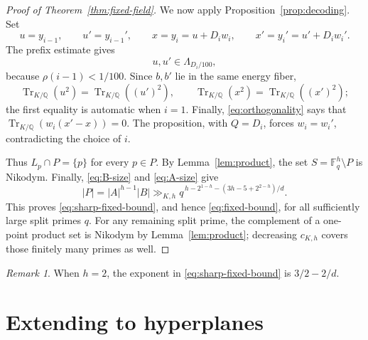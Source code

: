 \documentclass[11pt]{article}
\theoremstyle{plain}
\theoremstyle{remark}
\newtheorem{remark}[theorem]{Remark}
\newcommand{\F}{\mathbb F}
\newcommand{\Q}{\mathbb Q}
\newcommand{\Tr}{\operatorname{Tr}_{K/\Q}}
\begin{document}
\begin{proof}[Proof of Theorem~\ref{thm:fixed-field}]
We now apply Proposition~\ref{prop:decoding}.  Set
\[
  u=y_{i-1},
  \qquad
  u'=y_{i-1}',
  \qquad
  x=y_i=u+D_iw_i,
  \qquad
  x'=y_i'=u'+D_iw_i'.
\]
The prefix estimate gives
\[
  u,u'\in\Lambda_{D_i/100},
\]
because $\rho(i-1)<1/100$.  Since $b,b'$ lie in the same energy fiber,
\[
  \Tr(u^2)=\Tr((u')^2),
  \qquad
  \Tr(x^2)=\Tr((x')^2);
\]
the first equality is automatic when $i=1$.  Finally,
\eqref{eq:orthogonality} says that $\Tr(w_i(x'-x))=0$.  The proposition,
with $Q=D_i$, forces $w_i=w_i'$, contradicting the choice of $i$.

Thus $L_p\cap P=\{p\}$ for every $p\in P$.  By
Lemma~\ref{lem:product}, the set $S=\F_q^h\setminus P$ is Nikodym.  Finally,
\eqref{eq:B-size} and \eqref{eq:A-size} give
\[
  |P|=|A|^{h-1}|B|
  \gg_{K,h}q^{\,h-2^{1-h}-(3h-5+2^{2-h})/d}.
\]
This proves \eqref{eq:sharp-fixed-bound}, and hence
\eqref{eq:fixed-bound}, for all sufficiently large split primes $q$.
For any remaining split prime, the complement of a one-point product set is
Nikodym by Lemma~\ref{lem:product}; decreasing $c_{K,h}$ covers those finitely
many primes as well.
\end{proof}

\begin{remark}
When $h=2$, the exponent in \eqref{eq:sharp-fixed-bound} is
$3/2-2/d$.
\end{remark}

\section{Extending to hyperplanes}
\end{document}
